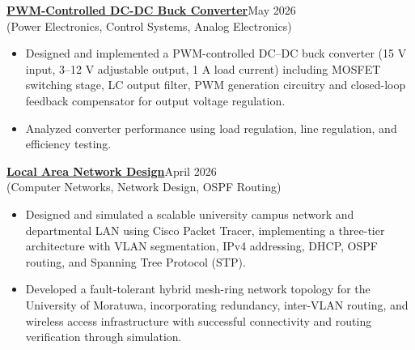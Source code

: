 \documentclass[10pt,a4paper]{article}
\begin{document}
\href{https://github.com/TharushaNimesh22/Design-and-Implementation-of-Closed-Loop-Buck-Converter-For-DC-Voltage-Regulation}{\textbf{PWM-Controlled DC-DC Buck Converter}}\hfill May 2026 \\
(Power Electronics, Control Systems, Analog Electronics)

\begin{itemize}
    \item Designed and implemented a PWM-controlled DC–DC buck converter (15 V input, 3–12 V adjustable output, 1 A load current) including MOSFET switching stage, LC output filter, PWM generation circuitry and closed-loop feedback compensator for output voltage regulation.
    \item Analyzed converter performance using load regulation, line regulation, and efficiency testing.
\end{itemize}

\vspace{0.3cm}




\href{https://github.com/TharushaNimesh22/Design-of-Local-Area-Network}{\textbf{Local Area Network Design}}\hfill April 2026 \\
(Computer Networks, Network Design, OSPF Routing)

\begin{itemize}
    \item Designed and simulated a scalable university campus network and departmental LAN using Cisco Packet Tracer, implementing a three-tier architecture with VLAN segmentation, IPv4 addressing, DHCP, OSPF routing, and Spanning Tree Protocol (STP).
    \item Developed a fault-tolerant hybrid mesh-ring network topology for the University of Moratuwa, incorporating redundancy, inter-VLAN routing, and wireless access infrastructure with successful connectivity and routing verification through simulation.
\end{itemize}


\vspace{0.3cm}









\end{document}

